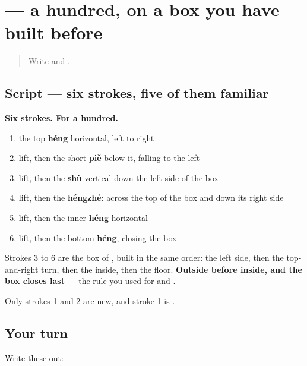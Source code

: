 \section[\texorpdfstring{\zh{百} (bǎi)}{百 (bǎi)}]{ — a hundred, on a box you have built before}

\label{lesson:ZH-W21-bai}



\begin{quote}
Write  and .
\end{quote}

\subsection*{Script — six strokes, five of them familiar}

\begin{quote}
\end{quote}

\textbf{Six strokes. For a hundred.}

\begin{enumerate}
\raggedright
  \item the top \textbf{héng} horizontal, left to right
  \item lift, then the short \textbf{piě} below it, falling to the left
  \item lift, then the \textbf{shù} vertical down the left side of the box
  \item lift, then the \textbf{héngzhé}: across the top of the box and down its right side
  \item lift, then the inner \textbf{héng} horizontal
  \item lift, then the bottom \textbf{héng}, closing the box
\end{enumerate}

Strokes 3 to 6 are the box of \textbf{}, built in the same order: the left side, then the top-and-right turn, then the inside, then the floor. \textbf{Outside before inside, and the box closes last} — the rule you used for  and .

Only strokes 1 and 2 are new, and stroke 1 is .

\subsection*{Your turn}
Write these out:

